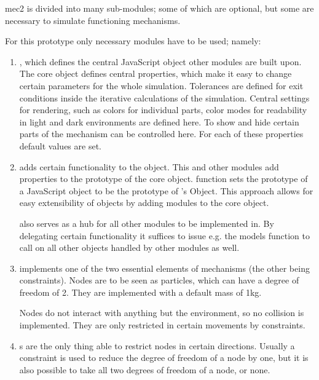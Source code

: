 mec2 is divided into many sub-modules; some of which are optional, but some are necessary to simulate functioning mechanisms.

For this prototype only necessary modules have to be used; namely:
\begin{enumerate}
    \item {}, which defines the central JavaScript object other modules are built upon.
    The core  object defines central properties, which make it easy to change certain parameters for the whole simulation.
    Tolerances are defined for exit conditions inside the iterative calculations of the simulation.
    Central settings for rendering, such as colors for individual parts, color modes for readability in light and dark environments are defined here.
    To show and hide certain parts of the mechanism can be controlled here.
    For each of these properties default values are set.

    \item {} adds certain functionality to the  object. 
    This and other  modules add properties to the prototype of the  core object.
      function sets the prototype of a JavaScript object to be the prototype of 's  Object.
    This approach allows for easy extensibility of objects by adding modules to the core object.

     also serves as a hub for all other modules to be implemented in.
    By delegating certain functionality it suffices to issue e.g. the models  function to call  on all other objects handled by other modules as well.
    
    \item {} implements one of the two essential elements of mechanisms (the other being constraints). Nodes are to be seen as particles, which can have a degree of freedom of 2. They are implemented with a default mass of 1kg.
    
    Nodes do not interact with anything but the environment, so no collision is implemented.
    They are only restricted in certain movements by constraints.

    \item {}s are the only thing able to restrict nodes in certain directions.
    Usually a constraint is used to reduce the degree of freedom of a node by one, but it is also possible to take all two degrees of freedom of a node, or none.
\end{enumerate}

